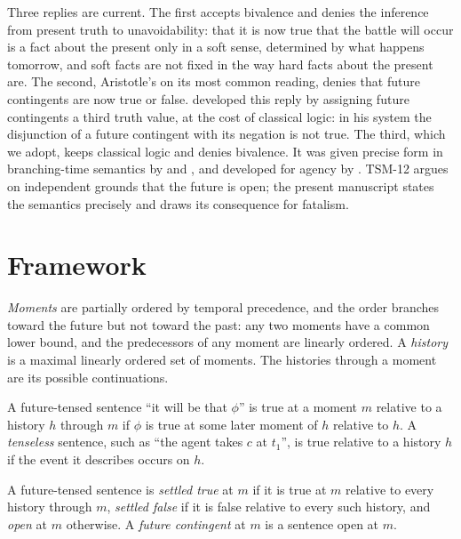 \documentclass{situationist-preprint}
\begin{document}
Three replies are current. The first accepts bivalence and denies the inference from present truth to unavoidability: that it is now true that the battle will occur is a fact about the present only in a soft sense, determined by what happens tomorrow, and soft facts are not fixed in the way hard facts about the present are. The second, Aristotle's on its most common reading, denies that future contingents are now true or false. \citet{Lukasiewicz1920} developed this reply by assigning future contingents a third truth value, at the cost of classical logic: in his system the disjunction of a future contingent with its negation is not true. The third, which we adopt, keeps classical logic and denies bivalence. It was given precise form in branching-time semantics by \citet{Prior1967} and \citet{Thomason1970}, and developed for agency by \citet{Belnap2001}. TSM-12 argues on independent grounds that the future is open; the present manuscript states the semantics precisely and draws its consequence for fatalism.

\section{Framework}

\begin{definition}\label{d:branch}
\emph{Moments} are partially ordered by temporal precedence, and the order branches toward the future but not toward the past: any two moments have a common lower bound, and the predecessors of any moment are linearly ordered. A \emph{history} is a maximal linearly ordered set of moments. The histories through a moment are its possible continuations.
\end{definition}

\begin{definition}\label{d:mh}
A future-tensed sentence \enquote{it will be that $\phi$} is true at a moment $m$ relative to a history $h$ through $m$ if $\phi$ is true at some later moment of $h$ relative to $h$. A \emph{tenseless} sentence, such as \enquote{the agent takes $c$ at $t_1$}, is true relative to a history $h$ if the event it describes occurs on $h$.
\end{definition}

\begin{definition}[Settledness]\label{d:settled}
A future-tensed sentence is \emph{settled true} at $m$ if it is true at $m$ relative to every history through $m$, \emph{settled false} if it is false relative to every such history, and \emph{open} at $m$ otherwise. A \emph{future contingent} at $m$ is a sentence open at $m$.
\end{definition}
\end{document}

